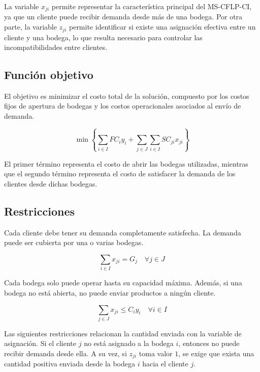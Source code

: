 \noindent La variable $x_{ji}$ permite representar la característica principal del MS-CFLP-CI, ya que un cliente puede recibir demanda desde más de una bodega. Por otra parte, la variable $z_{ji}$ permite identificar si existe una asignación efectiva entre un cliente y una bodega, lo que resulta necesario para controlar las incompatibilidades entre clientes.

\subsection{Función objetivo}

\noindent El objetivo es minimizar el costo total de la solución, compuesto por los costos fijos de apertura de bodegas y los costos operacionales asociados al envío de demanda.

\begin{equation}
\min
\left\{
\sum_{i \in I} FC_i y_i
+
\sum_{j \in J} \sum_{i \in I} SC_{ji} x_{ji}
\right\}
\end{equation}

\noindent El primer término representa el costo de abrir las bodegas utilizadas, mientras que el segundo término representa el costo de satisfacer la demanda de los clientes desde dichas bodegas.

\subsection{Restricciones}

\noindent Cada cliente debe tener su demanda completamente satisfecha. La demanda puede ser cubierta por una o varias bodegas.

\begin{equation}
\sum_{i \in I} x_{ji} = G_j \quad \forall j \in J
\end{equation}

\noindent Cada bodega solo puede operar hasta su capacidad máxima. Además, si una bodega no está abierta, no puede enviar productos a ningún cliente.

\begin{equation}
\sum_{j \in J} x_{ji} \leq C_i y_i \quad \forall i \in I
\end{equation}

\newpage

\noindent Las siguientes restricciones relacionan la cantidad enviada con la variable de asignación. Si el cliente $j$ no está asignado a la bodega $i$, entonces no puede recibir demanda desde ella. A su vez, si $z_{ji}$ toma valor $1$, se exige que exista una cantidad positiva enviada desde la bodega $i$ hacia el cliente $j$.

